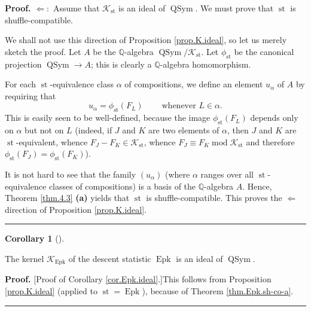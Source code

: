 \documentclass[numbers=enddot,12pt,final,onecolumn,notitlepage]{scrartcl}%
\theoremstyle{definition}
\newtheorem{coro}[theo]{Corollary}
\newenvironment{corollary}[1][]
{\begin{coro}[#1]\begin{leftbar}}
{\end{leftbar}\end{coro}}
\newenvironment{proof}[1][Proof]{\noindent\textbf{#1.} }{\ \rule{0.5em}{0.5em}}
\newenvironment{verlong}{}{}
\begin{document}
\begin{verlong}
\begin{proof}
$\Longleftarrow:$ Assume that $\mathcal{K}_{\operatorname*{st}}$ is an ideal
of $\operatorname*{QSym}$. We must prove that $\operatorname*{st}$ is shuffle-compatible.

We shall not use this direction of Proposition \ref{prop.K.ideal}, so let us
merely sketch the proof. Let $A$ be the $\mathbb{Q}$-algebra
$\operatorname*{QSym}/\mathcal{K}_{\operatorname*{st}}$. Let $\phi
_{\operatorname*{st}}$ be the canonical projection $\operatorname*{QSym}%
\rightarrow A$; this is clearly a $\mathbb{Q}$-algebra homomorphism.

For each $\operatorname*{st}$-equivalence class $\alpha$ of compositions, we
define an element $u_{\alpha}$ of $A$ by requiring that%
\[
u_{\alpha}=\phi_{\operatorname*{st}}\left(  F_{L}\right)
\ \ \ \ \ \ \ \ \ \ \text{whenever }L\in\alpha.
\]
This is easily seen to be well-defined, because the image $\phi
_{\operatorname*{st}}\left(  F_{L}\right)  $ depends only on $\alpha$ but not
on $L$ (indeed, if $J$ and $K$ are two elements of $\alpha$, then $J$ and $K$
are $\operatorname*{st}$-equivalent, whence $F_{J}-F_{K}\in\mathcal{K}%
_{\operatorname*{st}}$, whence $F_{J}\equiv F_{K}\operatorname{mod}%
\mathcal{K}_{\operatorname*{st}}$ and therefore $\phi_{\operatorname*{st}%
}\left(  F_{J}\right)  =\phi_{\operatorname*{st}}\left(  F_{K}\right)  $).

It is not hard to see that the family $\left(  u_{\alpha}\right)  $ (where
$\alpha$ ranges over all $\operatorname*{st}$-equivalence classes of
compositions) is a basis of the $\mathbb{Q}$-algebra $A$. Hence, Theorem
\ref{thm.4.3} \textbf{(a)} yields that $\operatorname*{st}$ is
shuffle-compatible. This proves the $\Longleftarrow$ direction of Proposition
\ref{prop.K.ideal}.
\end{proof}
\end{verlong}

\begin{corollary}
\label{cor.Epk.ideal}The kernel $\mathcal{K}_{\operatorname*{Epk}}$ of the
descent statistic $\operatorname*{Epk}$ is an ideal of $\operatorname*{QSym}$.
\end{corollary}

\begin{verlong}
\begin{proof}
[Proof of Corollary \ref{cor.Epk.ideal}.]This follows from Proposition
\ref{prop.K.ideal} (applied to $\operatorname*{st}=\operatorname*{Epk}$),
because of Theorem \ref{thm.Epk.sh-co-a}.
\end{proof}
\end{verlong}
\end{document}

